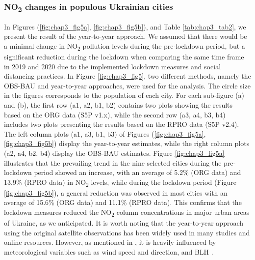 \subsubsection*{NO\textsubscript{2} changes in populous Ukrainian cities}
In Figures (\ref{fig:chap3_fig5a}, \ref{fig:chap3_fig5b}), and Table \ref{tab:chap3_tab2}, we present the result of the year-to-year approach. We assumed that there would be a minimal change in NO\textsubscript{2} pollution levels during the pre-lockdown period, but a significant reduction during the lockdown when comparing the same time frame in 2019 and 2020 due to the implemented lockdown measures and social distancing practices. In Figure \ref{fig:chap3_fig5}, two different methods, namely the OBS-BAU and year-to-year approaches, were used for the analysis. The circle size in the figures corresponds to the population of each city. For each sub-figure (a) and (b), the first row (a1, a2, b1, b2) contains two plots showing the results based on the ORG data (S5P v1.x), while the second row (a3, a4, b3, b4) includes two plots presenting the results based on the RPRO data (S5P v2.4). The left column plots (a1, a3, b1, b3) of Figures (\ref{fig:chap3_fig5a}, \ref{fig:chap3_fig5b}) display the year-to-year estimates, while the right column plots (a2, a4, b2, b4) display the OBS-BAU estimates. Figure \ref{fig:chap3_fig5a} illustrates that the prevailing trend in the nine selected cities during the pre-lockdown period showed an increase, with an average of 5.2\% (ORG data) and 13.9\% (RPRO data) in NO\textsubscript{2} levels, while during the lockdown period (Figure \ref{fig:chap3_fig5b}), a general reduction was observed in most cities with an average of 15.6\% (ORG data) and 11.1\% (RPRO data). This confirms that the lockdown measures reduced the NO\textsubscript{2} column concentrations in major urban areas of Ukraine, as we anticipated. It is worth noting that the year-to-year approach using the original satellite observations has been widely used in many studies and online resources. However, as mentioned in \citep{barre2021estimating,grange2021covid}, it is heavily influenced by meteorological variables such as wind speed and direction, and BLH \citep{wallace2009effect}.\par

